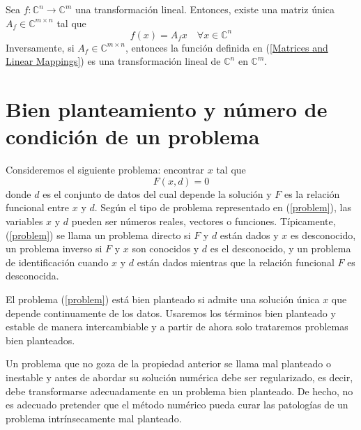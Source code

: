 \begin{property}
    Sea $f: \mathbb{C}^n \rightarrow \mathbb{C}^m$ una transformación lineal. Entonces, existe una matriz única $A_f \in \mathbb{C}^{m \times n}$ tal que
    \begin{equation}
        f(x) = A_f x \quad \forall x \in \mathbb{C}^n
        \label{Matrices and Linear Mappings}
    \end{equation}
    Inversamente, si $A_f \in \mathbb{C}^{m \times n}$, entonces la función definida en (\ref{Matrices and Linear Mappings}) es una transformación lineal de $\mathbb{C}^n$ en $\mathbb{C}^m$.
\end{property}

\section{Bien planteamiento y número de condición de un problema}
Consideremos el siguiente problema: encontrar $x$ tal que
\begin{equation}
    F(x, d) = 0
    \label{problem}
\end{equation}
donde $d$ es el conjunto de datos del cual depende la solución y $F$ es la relación funcional entre $x$ y $d$. Según el tipo de problema representado en (\ref{problem}), las variables $x$ y $d$ pueden ser números reales, vectores o funciones. Típicamente, (\ref{problem}) se llama un problema directo si $F$ y $d$ están dados y $x$ es desconocido, un problema inverso si $F$ y $x$ son conocidos y $d$ es el desconocido, y un problema de identificación cuando $x$ y $d$ están dados mientras que la relación funcional $F$ es desconocida.

El problema (\ref{problem}) está bien planteado si admite una solución única $x$ que depende continuamente de los datos. Usaremos los términos bien planteado y estable de manera intercambiable y a partir de ahora solo trataremos problemas bien planteados.

Un problema que no goza de la propiedad anterior se llama mal planteado o inestable y antes de abordar su solución numérica debe ser regularizado, es decir, debe transformarse adecuadamente en un problema bien planteado. De hecho, no es adecuado pretender que el método numérico pueda curar las patologías de un problema intrínsecamente mal planteado.

